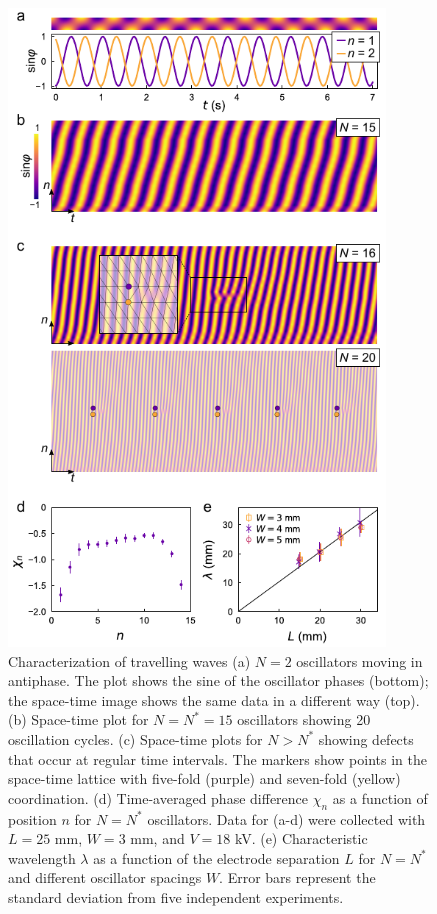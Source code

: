 \begin{figure}[p!]
    \centering
    \includegraphics[width=10cm]{figures/3_2.pdf}
    \caption{Characterization of travelling waves (a) $N=2$ oscillators moving in antiphase. The plot shows the sine of the oscillator phases (bottom); the space-time image shows the same data in a different way (top). (b) Space-time plot for $N=N^*=15$ oscillators showing 20 oscillation cycles. (c) Space-time plots for $N>N^*$ showing defects that occur at regular time intervals. The markers show points in the space-time lattice with five-fold (purple) and seven-fold (yellow) coordination. (d) Time-averaged phase difference $\chi_n$ as a function of position $n$ for $N=N^*$ oscillators. Data for (a-d) were collected with $L=25$ mm, $W=3$ mm, and $V=18$ kV.  (e) Characteristic wavelength $\lambda$ as a function of the electrode separation $L$ for $N=N^*$ and different oscillator spacings $W$. Error bars represent the standard deviation from five independent experiments.}
    \label{fig:3.2}
\end{figure}

